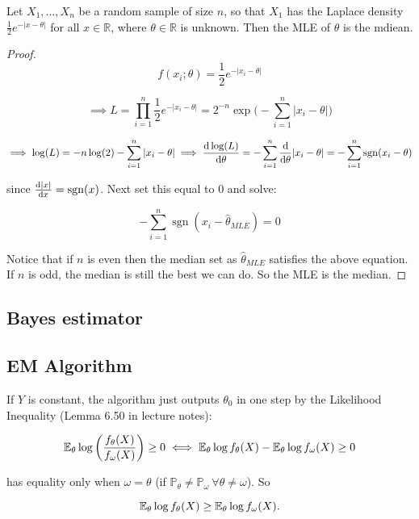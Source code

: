 \begin{proposition}
Let $X_{1},\ldots,X_{n}$ be a random sample of size $n$, so that $X_{1}$ has the Laplace density $\frac{1}{2}e^{-|x-\theta|}$ for all $x\in\mathbb{R}$, where $\theta\in\mathbb{R}$ is unknown. Then the MLE of $\theta$ is the mdiean.
\end{proposition}

\begin{proof}

\[
f(x_i; \theta) = \frac{1}{2}e^{-|x_i-\theta|}
\]

\[
\implies L = \prod_{i=1}^n  \frac{1}{2}e^{-|x_i-\theta|} = 2^{-n}  \exp \bigg(- \sum_{i=1}^n  |x_i-\theta|\bigg)
\]

\[
\implies \log(L) = -n \log (2) - \sum_{i=1}^n  |x_i-\theta|  \implies  \deriv{\log(L)}{\theta} = - \sum_{i=1}^n  \deriv{}{\theta} |x_i-\theta| = - \sum_{i=1}^n \operatorname{sgn} (x_i-\theta)
\]

since  \(\deriv{|x|}{x} =  \operatorname{sgn}(x)\). Next set this equal to 0 and solve:

\[
 - \sum_{i=1}^n \operatorname{sgn} (x_i-\hat{\theta}_{MLE}) = 0 
 \]
 
Notice that if \(n\) is even then the median set as \(\hat{\theta}_{MLE}\) satisfies the above equation. If \(n\) is odd, the median is still the best we can do. So the MLE is the median.

%
%
%


\end{proof}

\subsection{Bayes estimator}

\subsection{EM Algorithm}\label{mathstats.sec.em.alg}

\begin{remark}If \(Y\) is constant, the algorithm just outputs \(\theta_0\) in one step by the Likelihood Inequality (Lemma 6.50 in lecture notes):

\[
\E_\theta  \log \left( \frac{f_\theta(X) }{f_{\omega}(X) }  \right) \geq 0 \iff \E_\theta \log f_\theta(X) - \E_\theta \log f_\omega(X) \geq 0
\]

has equality only when \(\omega = \theta\) (if \(\mathbb{P}_\theta \neq \mathbb{P}_\omega \ \forall \theta \neq \omega\)). So

\[
\E_\theta \log f_\theta(X) \geq \E_\theta \log f_\omega(X).
\]

\end{remark}

